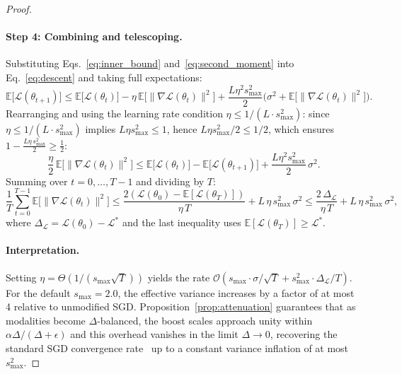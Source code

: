 \documentclass{article}
\newcommand{\loss}{\mathcal{L}}
\begin{document}
\begin{proof}
\paragraph{Step 4: Combining and telescoping.}
Substituting Eqs.~\eqref{eq:inner_bound} and~\eqref{eq:second_moment} into Eq.~\eqref{eq:descent} and taking full expectations:
%
\begin{equation*}
\mathbb{E}\bigl[\loss(\theta_{t+1})\bigr] \leq \mathbb{E}\bigl[\loss(\theta_t)\bigr]
- \eta\,\mathbb{E}\bigl[\|\nabla \loss(\theta_t)\|^2\bigr]
+ \frac{L\eta^2 s_{\max}^2}{2}\bigl(\sigma^2 + \mathbb{E}\bigl[\|\nabla \loss(\theta_t)\|^2\bigr]\bigr).
\end{equation*}
%
Rearranging and using the learning rate condition $\eta \leq 1/(L \cdot s_{\max}^2)$: since $\eta \leq 1/(L \cdot s_{\max}^{2})$ implies $L\eta s_{\max}^{2} \leq 1$, hence $L\eta s_{\max}^{2}/2 \leq 1/2$, which ensures $1 - \tfrac{L\eta\, s_{\max}^2}{2} \geq \tfrac{1}{2}$:
%
\begin{equation*}
\frac{\eta}{2}\,\mathbb{E}\bigl[\|\nabla \loss(\theta_t)\|^2\bigr]
\leq \mathbb{E}\bigl[\loss(\theta_t)\bigr] - \mathbb{E}\bigl[\loss(\theta_{t+1})\bigr]
+ \frac{L\eta^2 s_{\max}^2}{2}\,\sigma^2.
\end{equation*}
%
Summing over $t = 0, \ldots, T-1$ and dividing by $T$:
%
\begin{equation*}
\frac{1}{T}\sum_{t=0}^{T-1} \mathbb{E}\bigl[\|\nabla \loss(\theta_t)\|^2\bigr]
\leq \frac{2(\loss(\theta_0) - \mathbb{E}[\loss(\theta_T)])}{\eta\, T}
+ L\,\eta\, s_{\max}^2\, \sigma^2
\leq \frac{2\,\Delta_{\loss}}{\eta\, T}
+ L\,\eta\, s_{\max}^2\, \sigma^2,
\end{equation*}
%
where $\Delta_{\loss} = \loss(\theta_0) - \loss^{*}$ and the last inequality uses $\mathbb{E}[\loss(\theta_T)] \geq \loss^{*}$.

\paragraph{Interpretation.} Setting $\eta = \Theta(1/(s_{\max}\sqrt{T}))$ yields the rate $\mathcal{O}(s_{\max} \cdot \sigma / \sqrt{T} + s_{\max}^2 \cdot \Delta_{\loss} / T)$. For the default $s_{\max} = 2.0$, the effective variance increases by a factor of at most 4 relative to unmodified SGD. Proposition~\ref{prop:attenuation} guarantees that as modalities become $\Delta$-balanced, the boost scales approach unity within $\alpha \Delta / (\Delta + \epsilon)$ and this overhead vanishes in the limit $\Delta \to 0$, recovering the standard SGD convergence rate~\citep{ghadimi2013sgd} up to a constant variance inflation of at most $s_{\max}^2$.
\end{proof}
\end{document}
